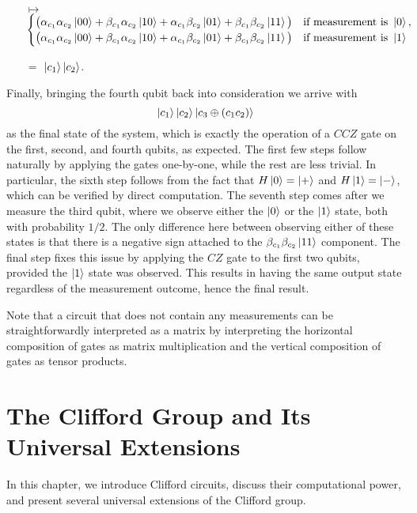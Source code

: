 \documentclass[12pt]{dalthesis}
\begin{document}
\begin{itemize}
\item[$\mapsto$] 
$\begin{cases} \big( \alpha_{c_1}\alpha_{c_2} \ket{00} + \beta_{c_1}\alpha_{c_2} \ket{10} + \alpha_{c_1}\beta_{c_2} \ket{01} + \beta_{c_1}\beta_{c_2} \ket{11} \big) & \mbox{if measurement is } \ket{0} , \\
\big( \alpha_{c_1}\alpha_{c_2} \ket{00} + \beta_{c_1}\alpha_{c_2} \ket{10} + \alpha_{c_1}\beta_{c_2} \ket{01} + \beta_{c_1}\beta_{c_2} \ket{11} \big) & \mbox{if measurement is } \ket{1} \end{cases}$

\item[$=$] $\ket{c_1}\ket{c_2}$.
\end{itemize}


Finally, bringing the fourth qubit back into consideration we arrive with 
\[
\ket{c_1}\ket{c_2}\ket{c_3 \oplus (c_1c_2)}
\] as the final state of the system, which is exactly the operation of a $CCZ$ gate on the first, second, and fourth qubits, as expected. The first few steps follow naturally by applying the gates one-by-one, while the rest are less trivial. In particular, the sixth step follows from the fact that $H\ket{0} = \ket{+}$ and $H\ket{1} = \ket{-}$, which can be verified by direct computation. The seventh step comes after we measure the third qubit, where we observe either the $\ket{0}$ or the $\ket{1}$ state, both with probability $1/2$. The only difference here between observing either of these states is that there is a negative sign attached to the $\beta_{c_1}\beta_{c_2} \ket{11}$ component. The final step fixes this issue by applying the $CZ$ gate to the first two qubits, provided the $\ket{1}$ state was observed. This results in having the same output state regardless of the measurement outcome, hence the final result.

Note that a circuit that does not contain any measurements can be straightforwardly interpreted as a matrix by interpreting the horizontal composition of gates as matrix multiplication and the vertical composition of gates as tensor products. 
 

\chapter{The Clifford Group and Its Universal Extensions}
\label{chap Stab}

In this chapter, we introduce Clifford circuits, discuss their computational power, and present several universal extensions of the Clifford group.
\end{document}
